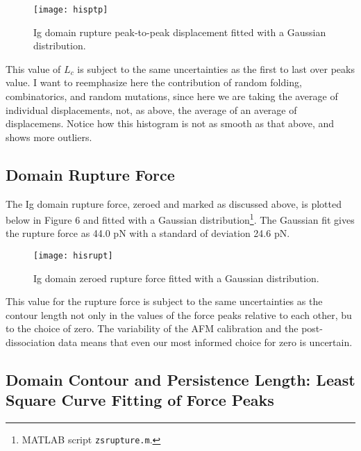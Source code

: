 \documentclass{article}
\begin{document}
\begin{figure}[H]
\texttt{[image: hisptp]}
\centering
\caption{Ig domain rupture peak-to-peak displacement fitted with a 
Gaussian distribution.}
\end{figure}

This value of $L_c$ is subject to the same uncertainties as the first to last over peaks
value. I want to reemphasize here the contribution of random folding, combinatorics,
and random mutations, since here we are taking the average of individual displacements,
not, as above, the average of an average of displacemens. Notice how this histogram is not as smooth as that above, and shows more outliers.

\subsection{Domain Rupture Force}

The Ig domain rupture force, zeroed and marked as discussed above, is plotted below in
Figure 6 and fitted with a Gaussian 
distribution\footnote{MATLAB script \texttt{zs\textunderscore rupture.m}.}.
The Gaussian fit gives the rupture force as 44.0 pN with a standard of deviation
24.6 pN.

\begin{figure}[H]
\texttt{[image: hisrupt]}
\centering
\caption{Ig domain zeroed rupture force fitted with a Gaussian distribution.}
\end{figure}

This value for the rupture force is subject to the same uncertainties as the contour length
not only in the values of the force peaks relative to each other, bu to the choice of zero.
The variability of the AFM calibration and the post-dissociation data means that even our 
most informed choice for zero is uncertain.

\subsection{Domain Contour and Persistence Length: Least Square
Curve Fitting of Force Peaks}
\end{document}
